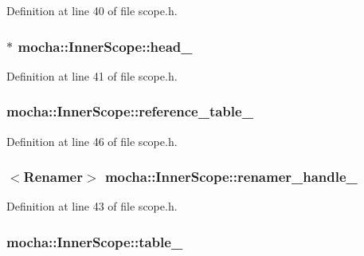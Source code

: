 Definition at line 40 of file scope.h.

\hypertarget{classmocha_1_1_inner_scope_a8e92c43467292b235fcecad87195a33d}{
\subsubsection[{head\_\-}]{$\ast$ {\bf mocha::InnerScope::head\_\-}}}
\label{classmocha_1_1_inner_scope_a8e92c43467292b235fcecad87195a33d}


Definition at line 41 of file scope.h.

\hypertarget{classmocha_1_1_inner_scope_a4cc531e5c4964519070138ea765d310e}{
\subsubsection[{reference\_\-table\_\-}]{ {\bf mocha::InnerScope::reference\_\-table\_\-}}}
\label{classmocha_1_1_inner_scope_a4cc531e5c4964519070138ea765d310e}


Definition at line 46 of file scope.h.

\hypertarget{classmocha_1_1_inner_scope_ae6b813153ed810a5de5376488b034066}{
\subsubsection[{renamer\_\-handle\_\-}]{$<${\bf Renamer}$>$ {\bf mocha::InnerScope::renamer\_\-handle\_\-}}}
\label{classmocha_1_1_inner_scope_ae6b813153ed810a5de5376488b034066}


Definition at line 43 of file scope.h.

\hypertarget{classmocha_1_1_inner_scope_a3f02a6410742e2a6f4e7475af5fc625a}{
\subsubsection[{table\_\-}]{ {\bf mocha::InnerScope::table\_\-}}}
\label{classmocha_1_1_inner_scope_a3f02a6410742e2a6f4e7475af5fc625a}


